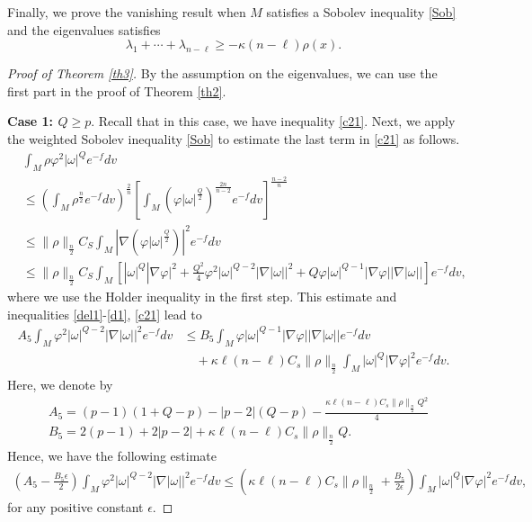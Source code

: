\documentclass[leqno,12pt]{article} %
\theoremstyle{plain} %
\theoremstyle{definition} %
\numberwithin{equation}{section}
\begin{document}
	Finally, we prove the vanishing result when $M$ satisfies a Sobolev inequality \eqref{Sob} and the eigenvalues satisfies $$\lambda_1+\cdots+\lambda_{n-\ell}\ge -\kappa(n-\ell)\rho(x).$$	
\begin{proof}[Proof of Theorem \ref{th3}]
	By the assumption on the eigenvalues, we can use the first part in the proof of Theorem \ref{th2}.
	
	\textbf{Case 1: $Q\ge p$}. Recall that in this case, we have inequality \eqref{c21}. Next, we apply the weighted Sobolev inequality \eqref{Sob} to estimate the last term in \eqref{c21} as follows.
	\begin{align*}
		&\int_M  \rho\varphi^2  |\omega|^{Q}e^{-f}dv\\
		&\le \left(\int_M \rho^{\frac{n}{2}}e^{-f}dv\right)^{\frac{2}{n}} \left[ \int_M \left(\varphi |\omega|^{\frac{Q}{2}}\right)^{\frac{2n}{n-2}}e^{-f}dv \right]^{\frac{n-2}{n}}\\
		&\le \|\rho\|_{\frac{n}{2}} C_S  \int_M \left|\nabla\left(\varphi |\omega|^{\frac{Q}{2}}\right)\right|^2 e^{-f}dv \\
		&	\le \|\rho\|_{\frac{n}{2}} C_S \int_M \left[|\omega {|^{Q}}|\nabla \varphi {|^2}  + 
		\frac{Q^2 }{4}{\varphi ^2}|\omega|^{Q-2} |\nabla |\omega |{|^2}+ 
		Q {\varphi |\omega |^{Q-1} | \nabla \varphi| |\nabla |\omega || }\right]e^{-f}dv,
	\end{align*}
	where we use the Holder inequality in the first step. This estimate and inequalities \eqref{del1}-\eqref{d1}, \eqref{c21} lead to
	\begin{align}\nonumber
		A_5 \int_M \varphi^2 |\omega|^{Q-2}|\nabla|\omega||^2 e^{-f}dv &\le B_5 \int_M \varphi |\omega|^{Q-1} |\nabla \varphi||\nabla|\omega||e^{-f}dv\\ \nonumber
		&\quad+\kappa \ell (n-\ell) C_s \|\rho\|_{\frac{n}{2}} \int_M |\omega|^Q |\nabla \varphi|^2 e^{-f}dv.
	\end{align}
	Here, we denote by 
	\begin{align*}
		&A_5=(p-1)(1+Q-p)-|p-2|(Q-p)-\frac{\kappa \ell (n-\ell)C_s \|\rho\|_{\frac{n}{2}} Q^2}{4}\\
		&B_5=2(p-1)+2|p-2|+\kappa \ell (n-\ell)C_s \|\rho\|_{\frac{n}{2}} Q.
	\end{align*}
	Hence, we have the following estimate
		\begin{align} \nonumber
		\left(A_5-\frac{B_5 \epsilon}{2}\right) \int_M \varphi^2 |\omega|^{Q-2}|\nabla|\omega||^2 e^{-f}dv \le \left(\kappa \ell (n-\ell)C_s \|\rho\|_{\frac{n}{2}}+\frac{B_5 }{2\epsilon} \right) \int_M |\omega|^Q |\nabla \varphi|^2 e^{-f}dv,
	\end{align}
	for any positive constant $\epsilon$.
	

\end{proof}
\end{document}
